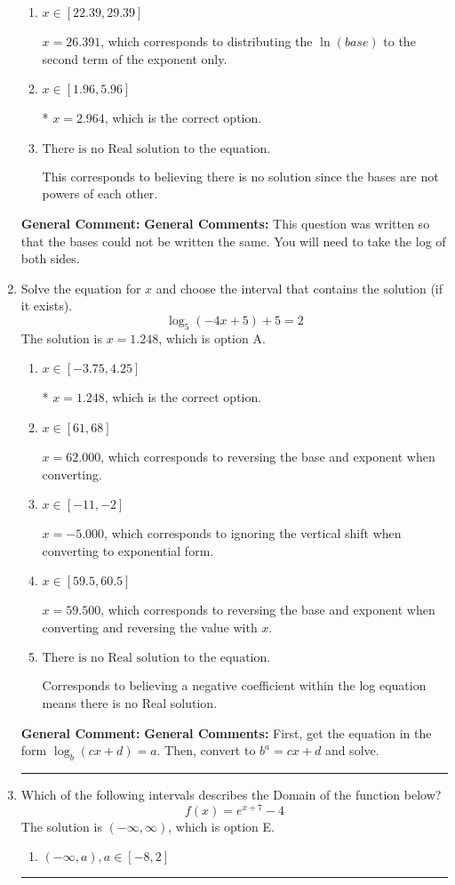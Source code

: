 \documentclass{extbook}[14pt]
\newcommand{\litem}[1]{\item #1

\rule{\textwidth}{0.4pt}}
\begin{document}
\begin{enumerate}
{\begin{enumerate}[label=\Alph*.]
$x = 10.000$, which corresponds to solving the numerators as equal while ignoring the bases are different.
\item \( x \in [22.39, 29.39] \)

$x = 26.391$, which corresponds to distributing the $\ln(base)$ to the second term of the exponent only.
\item \( x \in [1.96, 5.96] \)

* $x = 2.964$, which is the correct option.
\item \( \text{There is no Real solution to the equation.} \)

This corresponds to believing there is no solution since the bases are not powers of each other.
\end{enumerate}

\textbf{General Comment:} \textbf{General Comments:} This question was written so that the bases could not be written the same. You will need to take the log of both sides.
}
\litem{
Solve the equation for $x$ and choose the interval that contains the solution (if it exists).
\[ \log_{5}{(-4x+5)}+5 = 2 \]The solution is \( x = 1.248 \), which is option A.\begin{enumerate}[label=\Alph*.]
\item \( x \in [-3.75, 4.25] \)

* $x = 1.248$, which is the correct option.
\item \( x \in [61, 68] \)

$x = 62.000$, which corresponds to reversing the base and exponent when converting.
\item \( x \in [-11, -2] \)

$x = -5.000$, which corresponds to ignoring the vertical shift when converting to exponential form.
\item \( x \in [59.5, 60.5] \)

$x = 59.500$, which corresponds to reversing the base and exponent when converting and reversing the value with $x$.
\item \( \text{There is no Real solution to the equation.} \)

Corresponds to believing a negative coefficient within the log equation means there is no Real solution.
\end{enumerate}

\textbf{General Comment:} \textbf{General Comments:} First, get the equation in the form $\log_b{(cx+d)} = a$. Then, convert to $b^a = cx+d$ and solve.
}
\litem{
Which of the following intervals describes the Domain of the function below?
\[ f(x) = e^{x+7}-4 \]The solution is \( (-\infty, \infty) \), which is option E.\begin{enumerate}[label=\Alph*.]
\item \( (-\infty, a), a \in [-8, 2] \)


\end{enumerate}}
\end{enumerate}
\end{document}
